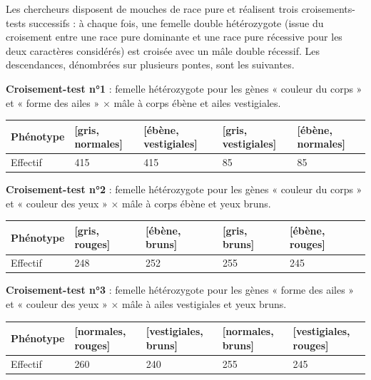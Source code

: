 \documentclass[11pt]{article}
\newcommand{\cle}[1]{{\popxbold\color{popdark}#1}}
\begin{document}
Les chercheurs disposent de mouches de race pure et réalisent trois \cle{croisements-tests} successifs : à chaque fois, une femelle double hétérozygote (issue du croisement entre une race pure dominante et une race pure récessive pour les deux caractères considérés) est croisée avec un mâle double récessif. Les descendances, dénombrées sur plusieurs pontes, sont les suivantes.

\textbf{Croisement-test n°1} : femelle hétérozygote pour les gènes « couleur du corps » et « forme des ailes » $\times$ mâle à corps ébène et ailes vestigiales.

\begin{center}
\begin{tabularx}{\linewidth}{|l|X|X|X|X|}
\hline
\rowcolor{popblue!40} Phénotype & [gris, normales] & [ébène, vestigiales] & [gris, vestigiales] & [ébène, normales] \\
\hline
Effectif & 415 & 415 & 85 & 85 \\
\hline
\end{tabularx}
\end{center}

\textbf{Croisement-test n°2} : femelle hétérozygote pour les gènes « couleur du corps » et « couleur des yeux » $\times$ mâle à corps ébène et yeux bruns.

\begin{center}
\begin{tabularx}{\linewidth}{|l|X|X|X|X|}
\hline
\rowcolor{popgreen!40} Phénotype & [gris, rouges] & [ébène, bruns] & [gris, bruns] & [ébène, rouges] \\
\hline
Effectif & 248 & 252 & 255 & 245 \\
\hline
\end{tabularx}
\end{center}

\textbf{Croisement-test n°3} : femelle hétérozygote pour les gènes « forme des ailes » et « couleur des yeux » $\times$ mâle à ailes vestigiales et yeux bruns.

\begin{center}
\begin{tabularx}{\linewidth}{|l|X|X|X|X|}
\hline
\rowcolor{poporange!40} Phénotype & [normales, rouges] & [vestigiales, bruns] & [normales, bruns] & [vestigiales, rouges] \\
\hline
Effectif & 260 & 240 & 255 & 245 \\
\hline
\end{tabularx}
\end{center}
\end{document}
